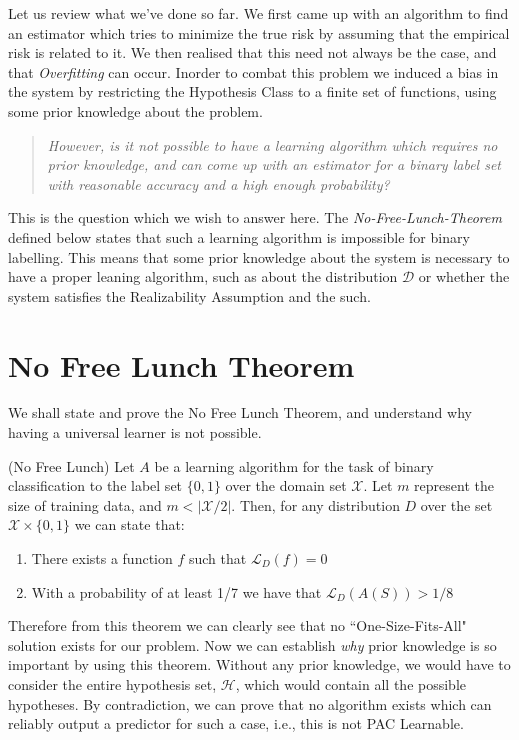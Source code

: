 \hspace{4mm} Let us review what we've done so far. We first came up with an algorithm to find an estimator which tries to minimize the true risk by assuming that the empirical risk is related to it. We then realised that this need not always be the case, and that \emph{Overfitting} can occur. Inorder to combat this problem we induced a bias in the system by restricting the Hypothesis Class to a finite set of functions, using some prior knowledge about the problem. 
\begin{quote}
   \textit{ However, is it not possible to have a learning algorithm which requires no prior knowledge, and can come up with an estimator for a binary label set with reasonable accuracy and a high enough probability? }
\end{quote}

\noindent This is the question which we wish to answer here. The \emph{No-Free-Lunch-Theorem} defined below states that such a learning algorithm is impossible for binary labelling. This means that some prior knowledge about the system is necessary to have a proper leaning algorithm, such as about the distribution $\mathcal{D}$ or whether the system satisfies the Realizability Assumption and the such.\\

\section{No Free Lunch Theorem}
\label{sec:nfl}

We shall state and prove the No Free Lunch Theorem, and understand why having a universal learner is not possible.
\begin{theorem}
(No Free Lunch) Let $A$ be a learning algorithm for the task of binary classification to the label set $\{0,1\}$ over the domain set $\mathcal{X}$. Let $m$ represent the size of training data, and $m<|\mathcal{X}/2|$. Then, for any distribution $D$ over the set $\mathcal{X}\times \{0,1\}$ we can state that:
\begin{enumerate}
    \item There exists a function $f$ such that $\mathcal{L}_D(f)=0$
    \item With a probability of at least 1/7 we have that $\mathcal{L}_D(A(S))>1/8$
\end{enumerate}
\end{theorem}

Therefore from this theorem we can clearly see that no ``One-Size-Fits-All" solution exists for our problem. Now we can establish \emph{why} prior knowledge is so important by using this theorem. Without any prior knowledge, we would have to consider the entire hypothesis set, $\mathcal{H}$, which would contain all the possible hypotheses. By contradiction, we can prove that no algorithm exists which can reliably output a predictor for such a case, i.e., this is not PAC Learnable.\\

